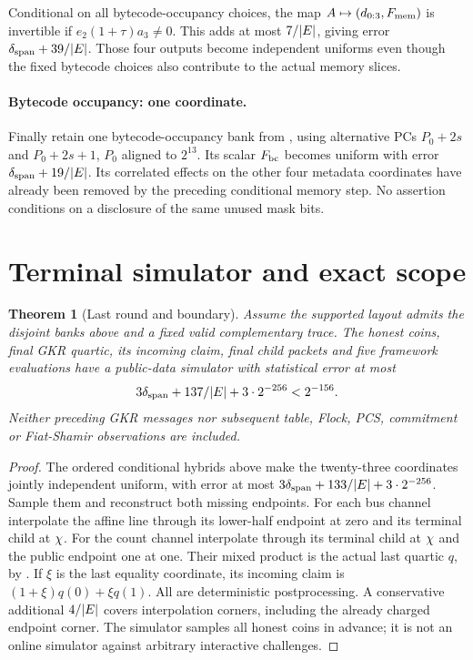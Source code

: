\documentclass[11pt]{article}
\newtheorem{theorem}{Theorem}
\begin{document}
Conditional on all bytecode-occupancy choices, the map $A\mapsto(d_{0:3},F_{\rm mem})$ is invertible if $e_2(1+\tau)a_3\ne0$. This adds at most $7/|E|$, giving error $\delta_{\rm span}+39/|E|$. Those four outputs become independent uniforms even though the fixed bytecode choices also contribute to the actual memory slices.

\paragraph{Bytecode occupancy: one coordinate.} Finally retain one bytecode-occupancy bank from , using alternative PCs $P_0+2s$ and $P_0+2s+1$, $P_0$ aligned to $2^{13}$. Its scalar $F_{\rm bc}$ becomes uniform with error $\delta_{\rm span}+19/|E|$. Its correlated effects on the other four metadata coordinates have already been removed by the preceding conditional memory step. No assertion conditions on a disclosure of the same unused mask bits.

\section{Terminal simulator and exact scope}

\begin{theorem}[Last round and boundary]
Assume the supported layout admits the disjoint banks above and a fixed valid complementary trace. The honest coins, final GKR quartic, its incoming claim, final child packets and five framework evaluations have a public-data simulator with statistical error at most
\[
 3\delta_{\rm span}+137/|E|+3\cdot2^{-256}<2^{-156}.
\]
Neither preceding GKR messages nor subsequent table, Flock, PCS, commitment or Fiat-Shamir observations are included.
\end{theorem}
\begin{proof}
The ordered conditional hybrids above make the twenty-three coordinates jointly independent uniform, with error at most $3\delta_{\rm span}+133/|E|+3\cdot2^{-256}$. Sample them and reconstruct both missing endpoints. For each bus channel interpolate the affine line through its lower-half endpoint at zero and its terminal child at $\chi$. For the count channel interpolate through its terminal child at $\chi$ and the public endpoint one at one. Their mixed product is the actual last quartic $q$, by . If $\xi$ is the last equality coordinate, its incoming claim is $(1+\xi)q(0)+\xi q(1)$. All are deterministic postprocessing. A conservative additional $4/|E|$ covers interpolation corners, including the already charged endpoint corner. The simulator samples all honest coins in advance; it is not an online simulator against arbitrary interactive challenges.
\end{proof}
\end{document}
